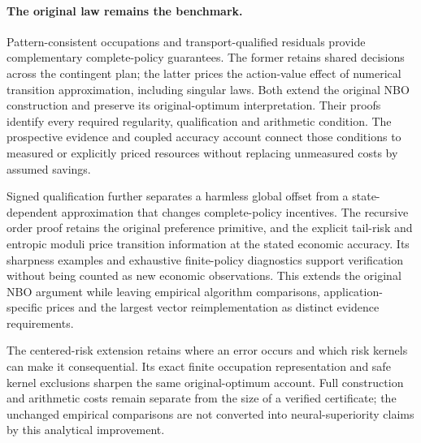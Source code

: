 \documentclass[ecta,nameyear,draft]{econsocart}
\begin{document}
\paragraph{The original law remains the benchmark.}
Pattern-consistent occupations and transport-qualified residuals provide complementary complete-policy guarantees. The former retains shared decisions across the contingent plan; the latter prices the action-value effect of numerical transition approximation, including singular laws. Both extend the original NBO construction and preserve its original-optimum interpretation. Their proofs identify every required regularity, qualification and arithmetic condition. The prospective evidence and coupled accuracy account connect those conditions to measured or explicitly priced resources without replacing unmeasured costs by assumed savings.


Signed qualification further separates a harmless global offset from a state-dependent approximation that changes complete-policy incentives. The recursive order proof retains the original preference primitive, and the explicit tail-risk and entropic moduli price transition information at the stated economic accuracy. Its sharpness examples and exhaustive finite-policy diagnostics support verification without being counted as new economic observations. This extends the original NBO argument while leaving empirical algorithm comparisons, application-specific prices and the largest vector reimplementation as distinct evidence requirements.


The centered-risk extension retains where an error occurs and which risk kernels can make it consequential. Its exact finite occupation representation and safe kernel exclusions sharpen the same original-optimum account. Full construction and arithmetic costs remain separate from the size of a verified certificate; the unchanged empirical comparisons are not converted into neural-superiority claims by this analytical improvement.



\end{document}
